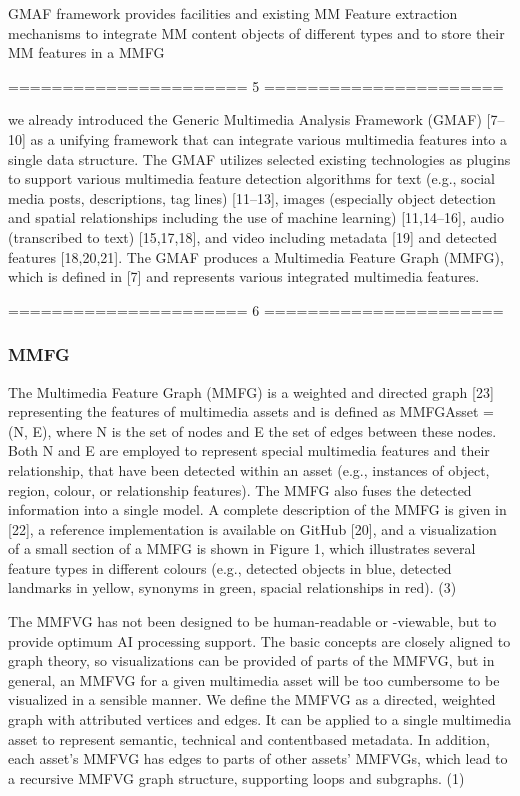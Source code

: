 GMAF framework provides facilities and existing MM Feature extraction mechanisms to integrate MM content objects of different types and to store their MM features in a MMFG

====================== 5
======================

we already introduced the Generic Multimedia Analysis Framework (GMAF) [7–10] as a unifying framework that can integrate various multimedia features into a single data structure.
The GMAF utilizes selected existing technologies as plugins to support various multimedia feature detection algorithms for text (e.g., social media posts, descriptions, tag lines) [11–13], images (especially object detection and spatial relationships including the use of machine learning) [11,14–16], audio (transcribed to text) [15,17,18], and video including metadata [19] and detected features [18,20,21].
The GMAF produces a Multimedia Feature Graph (MMFG), which is defined in [7] and represents various integrated multimedia features.

====================== 6
======================

\clearpage

\subsubsection{MMFG}
The Multimedia Feature Graph (MMFG) is a weighted and directed graph [23] representing
the features of multimedia assets and is defined as MMFGAsset = (N, E), where
N is the set of nodes and E the set of edges between these nodes. Both N and E are
employed to represent special multimedia features and their relationship, that have been
detected within an asset (e.g., instances of object, region, colour, or relationship features).
The MMFG also fuses the detected information into a single model. A complete description
of the MMFG is given in [22], a reference implementation is available on GitHub [20], and a
visualization of a small section of a MMFG is shown in Figure 1, which illustrates several
feature types in different colours (e.g., detected objects in blue, detected landmarks in
yellow, synonyms in green, spacial relationships in red). (3)

The MMFVG has not been designed to be human-readable or -viewable, but to provide
optimum AI processing support. The basic concepts are closely aligned to graph theory, so
visualizations can be provided of parts of the MMFVG, but in general, an MMFVG for a
given multimedia asset will be too cumbersome to be visualized in a sensible manner. We
define the MMFVG as a directed, weighted graph with attributed vertices and edges. It
can be applied to a single multimedia asset to represent semantic, technical and contentbased
metadata. In addition, each asset’s MMFVG has edges to parts of other assets’
MMFVGs, which lead to a recursive MMFVG graph structure, supporting loops and
subgraphs. (1)

